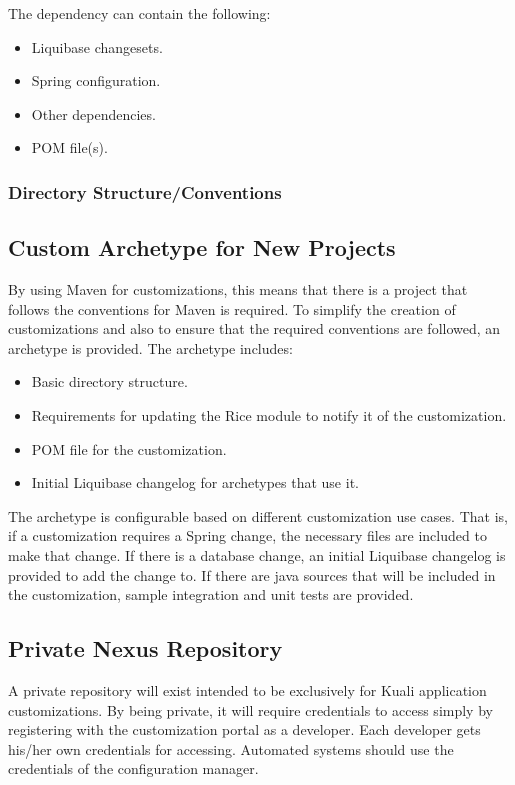\documentclass[12pt]{report}
\begin{document}
The dependency can contain the following:
\begin{itemize}
\item Liquibase changesets.
\item Spring configuration.
\item Other dependencies.
\item POM file(s).
\end{itemize}

\subsubsection{Directory Structure/Conventions}

\subsection{Custom Archetype for New Projects}
By using Maven for customizations, this means that there is a project that follows the conventions for Maven is required. To 
simplify the creation of customizations and also to ensure that the required conventions are followed, an archetype is provided. The
archetype includes:
\begin{itemize}
  \item Basic directory structure.
  \item Requirements for updating the Rice module to notify it of the customization.
  \item POM file for the customization.
  \item Initial Liquibase changelog for archetypes that use it.
\end{itemize}

The archetype is configurable based on different customization use cases. That is, if a customization requires a Spring change, the
necessary files are included to make that change. If there is a database change, an initial Liquibase changelog is provided to add
the change to. If there are java sources that will be included in the customization, sample integration and unit tests are provided.

\subsection{Private Nexus Repository}

A private repository will exist intended to be exclusively for Kuali application customizations. By being private, it will require
credentials to access simply by registering with the customization portal as a developer. Each developer gets his/her own 
credentials for accessing. Automated systems should use the credentials of the configuration manager.
\end{document}
